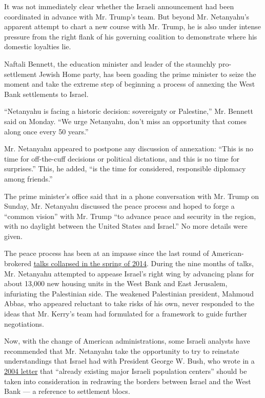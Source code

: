 It was not immediately clear whether the Israeli announcement had been
coordinated in advance with Mr. Trump's team. But beyond Mr. Netanyahu's
apparent attempt to chart a new course with Mr. Trump, he is also under
intense pressure from the right flank of his governing coalition to
demonstrate where his domestic loyalties lie.

Naftali Bennett, the education minister and leader of the staunchly
pro-settlement Jewish Home party, has been goading the prime minister to
seize the moment and take the extreme step of beginning a process of
annexing the West Bank settlements to Israel.

``Netanyahu is facing a historic decision: sovereignty or Palestine,''
Mr. Bennett said on Monday. ``We urge Netanyahu, don't miss an
opportunity that comes along once every 50 years.''

Mr. Netanyahu appeared to postpone any discussion of annexation: ``This
is no time for off-the-cuff decisions or political dictations, and this
is no time for surprises.'' This, he added, ``is the time for
considered, responsible diplomacy among friends.''

The prime minister's office said that in a phone conversation with Mr.
Trump on Sunday, Mr. Netanyahu discussed the peace process and hoped to
forge a ``common vision'' with Mr. Trump ``to advance peace and security
in the region, with no daylight between the United States and Israel.''
No more details were given.

The peace process has been at an impasse since the last round of
American-brokered
\href{https://www.nytimes.com/2014/04/29/world/middleeast/arc-of-a-failed-deal-how-nine-months-of-mideast-talks-ended-in-dissarray.html}{talks
collapsed in the spring of 2014}. During the nine months of talks, Mr.
Netanyahu attempted to appease Israel's right wing by advancing plans
for about 13,000 new housing units in the West Bank and East Jerusalem,
infuriating the Palestinian side. The weakened Palestinian president,
Mahmoud Abbas, who appeared reluctant to take risks of his own, never
responded to the ideas that Mr. Kerry's team had formulated for a
framework to guide further negotiations.

Now, with the change of American administrations, some Israeli analysts
have recommended that Mr. Netanyahu take the opportunity to try to
reinstate understandings that Israel had with President George W. Bush,
who wrote in a
\href{https://georgewbush-whitehouse.archives.gov/news/releases/2004/04/20040414-3.html}{2004
letter} that ``already existing major Israeli population centers''
should be taken into consideration in redrawing the borders between
Israel and the West Bank --- a reference to settlement blocs.


